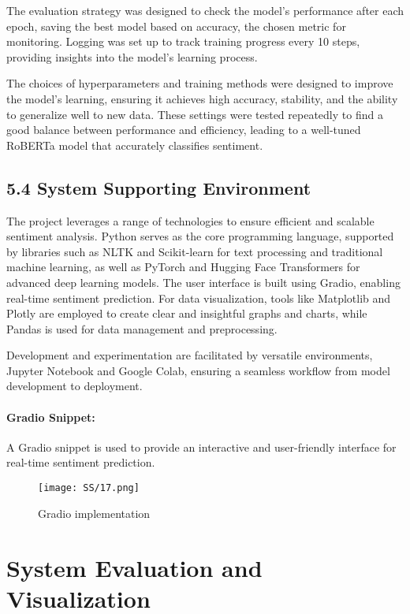 \documentclass[journal]{IEEEtran}
\begin{document}
The evaluation strategy was designed to check the model's performance after each epoch, saving the best model based on accuracy, the chosen metric for monitoring. Logging was set up to track training progress every 10 steps, providing insights into the model's learning process.

The choices of hyperparameters and training methods were designed to improve the model's learning, ensuring it achieves high accuracy, stability, and the ability to generalize well to new data. These settings were tested repeatedly to find a good balance between performance and efficiency, leading to a well-tuned RoBERTa model that accurately classifies sentiment.

\subsection*{\textbf{5.4 System Supporting Environment}}
The project leverages a range of technologies to ensure efficient and scalable sentiment analysis. Python serves as the core programming language, supported by libraries such as NLTK and Scikit-learn for text processing and traditional machine learning, as well as PyTorch and Hugging Face Transformers for advanced deep learning models. The user interface is built using Gradio, enabling real-time sentiment prediction. For data visualization, tools like Matplotlib and Plotly are employed to create clear and insightful graphs and charts, while Pandas is used for data management and preprocessing. 

Development and experimentation are facilitated by versatile environments, Jupyter Notebook and Google Colab, ensuring a seamless workflow from model development to deployment.

\paragraph{\textbf{Gradio Snippet:}}
A Gradio snippet is used to provide an interactive and user-friendly interface for real-time sentiment prediction.
\begin{figure}[H]
\centering
\texttt{[image: SS/17.png]}
\caption{Gradio implementation }
\end{figure}

\section{\textbf{System Evaluation and Visualization}}
\end{document}
